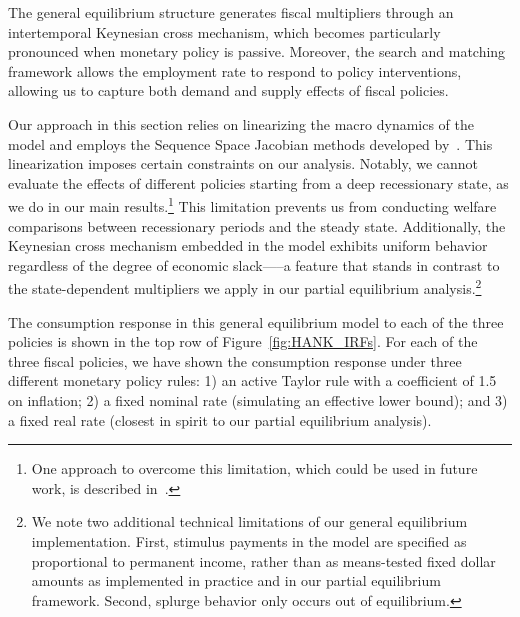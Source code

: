 \documentclass[\latexroot/\projectname]{subfiles}
\begin{document}
The general equilibrium structure generates fiscal multipliers through an intertemporal Keynesian cross mechanism, which becomes particularly pronounced when monetary policy is passive. Moreover, the search and matching framework allows the employment rate to respond to policy interventions, allowing us to capture both demand and supply effects of fiscal policies.

Our approach in this section relies on linearizing the macro dynamics of the model and employs the Sequence Space Jacobian methods developed by~\cite{Auclert2021}. This linearization imposes certain constraints on our analysis. Notably, we cannot evaluate the effects of different policies starting from a deep recessionary state, as we do in our main results.\footnote{One approach to overcome this limitation, which could be used in future work, is described in~\cite{bkmMitShocks}.} This limitation prevents us from conducting welfare comparisons between recessionary periods and the steady state. Additionally, the Keynesian cross mechanism embedded in the model exhibits uniform behavior regardless of the degree of economic slack—--a feature that stands in contrast to the state-dependent multipliers we apply in our partial equilibrium analysis.\footnote{We note two additional technical limitations of our general equilibrium implementation. First, stimulus payments in the model are specified as proportional to permanent income, rather than as means-tested fixed dollar amounts as implemented in practice and in our partial equilibrium framework. Second, splurge behavior only occurs out of equilibrium.}

The consumption response in this general equilibrium model to each of the three policies is shown in the top row of Figure~\ref{fig:HANK_IRFs}. For each of the three fiscal policies, we have shown the consumption response under three different monetary policy rules: 1) an active Taylor rule with a coefficient of 1.5 on inflation; 2) a fixed nominal rate (simulating an effective lower bound); and 3) a fixed real rate (closest in spirit to our partial equilibrium analysis).



\end{document}
